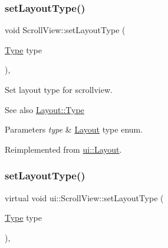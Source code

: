 \subsubsection{\texorpdfstring{set\+Layout\+Type()}{setLayoutType()}\hspace{0.1cm}{\footnotesize\ttfamily [1/2]}}
{\footnotesize\ttfamily void Scroll\+View\+::set\+Layout\+Type (\begin{DoxyParamCaption}\item[{\hyperlink{classui_1_1Layout_aecabbc1592677eadd6757edc1df5b952}{Type}}]{type }\end{DoxyParamCaption})\hspace{0.3cm}{\ttfamily [override]}, {\ttfamily [virtual]}}

Set layout type for scrollview.

\begin{DoxySeeAlso}{See also}
{\ttfamily \hyperlink{classui_1_1Layout_aecabbc1592677eadd6757edc1df5b952}{Layout\+::\+Type}} 
\end{DoxySeeAlso}

\begin{DoxyParams}{Parameters}
{\em type} & \hyperlink{classui_1_1Layout}{Layout} type enum. \\
\hline
\end{DoxyParams}


Reimplemented from \hyperlink{classui_1_1Layout_a79c8c32f381022f2da2984b6f03d711c}{ui\+::\+Layout}.

\mbox{\label{classui_1_1ScrollView_a4056a0a2c5653b6e00fa983740f621d9}} 
\subsubsection{\texorpdfstring{set\+Layout\+Type()}{setLayoutType()}\hspace{0.1cm}{\footnotesize\ttfamily [2/2]}}
{\footnotesize\ttfamily virtual void ui\+::\+Scroll\+View\+::set\+Layout\+Type (\begin{DoxyParamCaption}\item[{\hyperlink{classui_1_1Layout_aecabbc1592677eadd6757edc1df5b952}{Type}}]{type }\end{DoxyParamCaption})\hspace{0.3cm}{\ttfamily [override]}, {\ttfamily [virtual]}}


